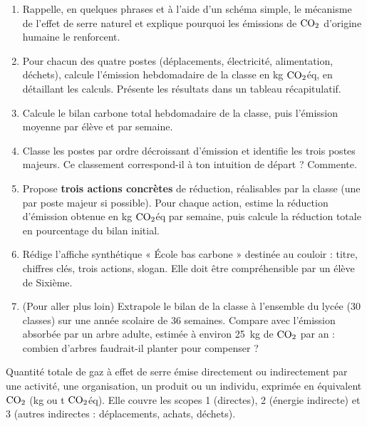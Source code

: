 \documentclass[11pt]{article}
\newcounter{popsec}
\newcounter{popsub}
\newcommand{\courssub}[1]{%
  \stepcounter{popsub}%
  \par\vspace{9pt}\noindent{\popxbold\fontsize{11.5}{13}\selectfont\color{popink}{\color{poporange}\thepopsec.\thepopsub}\hspace{6pt}#1}\par\nopagebreak\vspace{4pt}
}
\begin{document}
\begin{enumerate}
\item Rappelle, en quelques phrases et à l'aide d'un schéma simple, le mécanisme de l'effet de serre naturel et explique pourquoi les émissions de $\ce{CO2}$ d'origine humaine le renforcent.
\item Pour chacun des quatre postes (déplacements, électricité, alimentation, déchets), calcule l'émission hebdomadaire de la classe en kg $\ce{CO2}$éq, en détaillant les calculs. Présente les résultats dans un tableau récapitulatif.
\item Calcule le bilan carbone total hebdomadaire de la classe, puis l'émission moyenne par élève et par semaine.
\item Classe les postes par ordre décroissant d'émission et identifie les trois postes majeurs. Ce classement correspond-il à ton intuition de départ ? Commente.
\item Propose \textbf{trois actions concrètes} de réduction, réalisables par la classe (une par poste majeur si possible). Pour chaque action, estime la réduction d'émission obtenue en kg $\ce{CO2}$éq par semaine, puis calcule la réduction totale en pourcentage du bilan initial.
\item Rédige l'affiche synthétique « École bas carbone » destinée au couloir : titre, chiffres clés, trois actions, slogan. Elle doit être compréhensible par un élève de Sixième.
\item (Pour aller plus loin) Extrapole le bilan de la classe à l'ensemble du lycée (30 classes) sur une année scolaire de 36 semaines. Compare avec l'émission absorbée par un arbre adulte, estimée à environ \SI{25}{kg} de $\ce{CO2}$ par an : combien d'arbres faudrait-il planter pour compenser ?
\end{enumerate}

\courssub{Ressources à mobiliser}

\begin{definition}
Quantité totale de gaz à effet de serre émise directement ou indirectement par une activité, une organisation, un produit ou un individu, exprimée en équivalent $\ce{CO2}$ (kg ou t $\ce{CO2}$éq). Elle couvre les scopes 1 (directes), 2 (énergie indirecte) et 3 (autres indirectes : déplacements, achats, déchets).
\end{definition}
\end{document}
